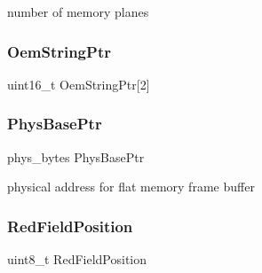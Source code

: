 number of memory planes 

\hypertarget{struct____attribute_____a40bb36a43f8b3c4f8e9640007c5da428}{}\label{struct____attribute_____a40bb36a43f8b3c4f8e9640007c5da428} 
\subsubsection{\texorpdfstring{Oem\+String\+Ptr}{OemStringPtr}}
{\footnotesize\ttfamily uint16\+\_\+t Oem\+String\+Ptr\mbox{[}2\mbox{]}}

\hypertarget{struct____attribute_____a1d11f4921094db253fc2c2ee6fbb2afb}{}\label{struct____attribute_____a1d11f4921094db253fc2c2ee6fbb2afb} 
\subsubsection{\texorpdfstring{Phys\+Base\+Ptr}{PhysBasePtr}}
{\footnotesize\ttfamily phys\+\_\+bytes Phys\+Base\+Ptr}



physical address for flat memory frame buffer 

\hypertarget{struct____attribute_____a20cb142b8c1b0a2b41244fef469a11f4}{}\label{struct____attribute_____a20cb142b8c1b0a2b41244fef469a11f4} 
\subsubsection{\texorpdfstring{Red\+Field\+Position}{RedFieldPosition}}
{\footnotesize\ttfamily uint8\+\_\+t Red\+Field\+Position}

\hypertarget{struct____attribute_____a5e25f6a8eedde631fff577bcf7d4f6f4}{}\label{struct____attribute_____a5e25f6a8eedde631fff577bcf7d4f6f4} 
